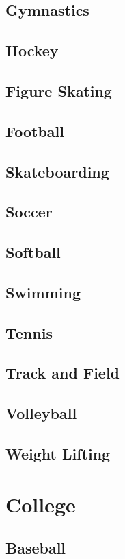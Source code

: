 		\subsection{Gymnastics}
		
		\subsection{Hockey}
		\subsection{Figure Skating}
		\subsection{Football}
		\subsection{Skateboarding}		
		\subsection{Soccer}
		\subsection{Softball}
		\subsection{Swimming}
		\subsection{Tennis}
		\subsection{Track and Field}
		\subsection{Volleyball}
		\subsection{Weight Lifting}
		\newpage
	\section{College}
		\subsection{Baseball}
